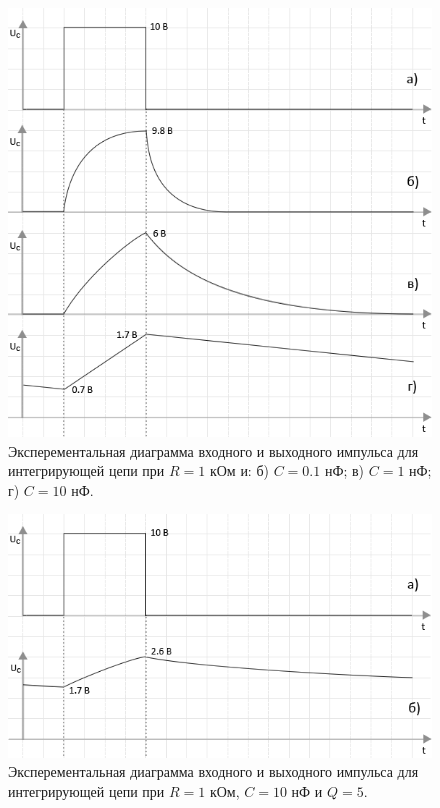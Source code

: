 \begin{figure}[H]
	\begin{center}
		\includegraphics[width=14cm]{img/int}
		\caption{Эксперементальная диаграмма входного и выходного импульса для интегрирующей цепи при $R = 1$ кОм и: б) $C = 0.1$ нФ; в) $C = 1$ нФ; г) $C = 10$ нФ.} 
		\label{i:1} %
	\end{center}
\end{figure}

\begin{figure}[H]
	\begin{center}
		\includegraphics[width=14cm]{img/q5}
		\caption{Эксперементальная диаграмма входного и выходного импульса для интегрирующей цепи при $R = 1$ кОм, $C = 10$ нФ и $Q = 5$.} 
		\label{i:2} %
	\end{center}
\end{figure}

